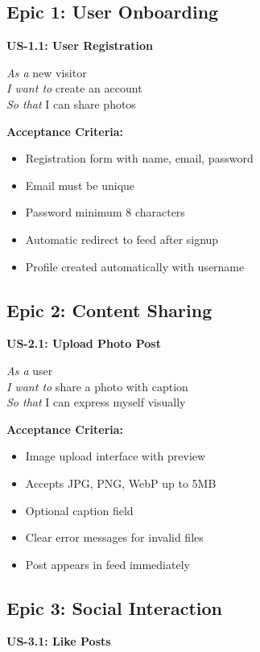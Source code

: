 \documentclass[12pt,a4paper]{report}
\begin{document}
\subsection{Epic 1: User Onboarding}

\textbf{US-1.1: User Registration}

\textit{As a} new visitor \\
\textit{I want to} create an account \\
\textit{So that} I can share photos

\textbf{Acceptance Criteria:}
\begin{itemize}
    \item Registration form with name, email, password
    \item Email must be unique
    \item Password minimum 8 characters
    \item Automatic redirect to feed after signup
    \item Profile created automatically with username
\end{itemize}

\subsection{Epic 2: Content Sharing}

\textbf{US-2.1: Upload Photo Post}

\textit{As a} user \\
\textit{I want to} share a photo with caption \\
\textit{So that} I can express myself visually

\textbf{Acceptance Criteria:}
\begin{itemize}
    \item Image upload interface with preview
    \item Accepts JPG, PNG, WebP up to 5MB
    \item Optional caption field
    \item Clear error messages for invalid files
    \item Post appears in feed immediately
\end{itemize}

\subsection{Epic 3: Social Interaction}

\textbf{US-3.1: Like Posts}
\end{document}

